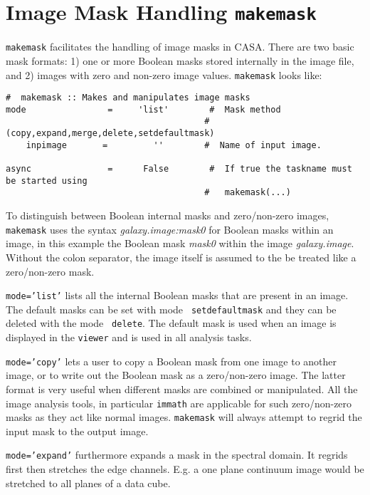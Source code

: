 \section{Image Mask Handling {\tt makemask}}
\label{section:analysis.makemask}

{\tt makemask} facilitates the handling of image masks in CASA. There
are two basic mask formats: 1) one or more Boolean masks stored
internally in the image file, and 2) images with zero and non-zero image
values. {\tt makemask} looks like:

\small
\begin{verbatim}
#  makemask :: Makes and manipulates image masks
mode                =     'list'        #  Mask method
                                       #   (copy,expand,merge,delete,setdefaultmask)
    inpimage       =         ''        #  Name of input image.

async               =      False        #  If true the taskname must be started using
                                       #   makemask(...) 
\end{verbatim}
\normalsize

To distinguish between Boolean internal masks and zero/non-zero
images, {\tt makemask} uses the syntax {\it galaxy.image:mask0} for Boolean
masks within an image, in this example the Boolean mask {\it mask0}
within the image {\it galaxy.image}. Without the colon separator, the image
itself is assumed to the be treated like a zero/non-zero mask.


{\tt mode='list'} lists all the internal Boolean masks that are
present in an image. The default masks can be set with mode {\tt
  setdefaultmask} and they can be deleted with the mode {\tt
  delete}. The default mask is used when an image is displayed in the
{\tt viewer} and is used in all analysis tasks.


{\tt mode='copy'} lets a user to copy a Boolean mask from one image to
another image, or to write out the Boolean mask as a zero/non-zero
image. The latter format is very useful when different masks are
combined or manipulated. All the image analysis tools, in particular
{\tt immath} are applicable for such zero/non-zero masks as they act
like normal images. {\tt makemask} will always attempt to regrid the
input mask to the output image.


{\tt mode='expand'} furthermore expands a mask in the spectral
domain. It regrids first then stretches the edge channels. E.g. a one
plane continuum image would be stretched to all planes of a
data cube. 

